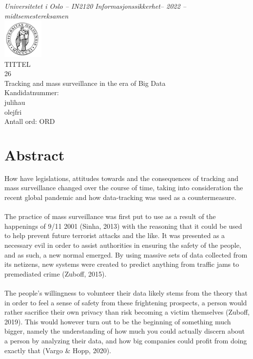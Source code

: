 \documentclass[11pt]{article}
\newcommand{\tittel}{TITTEL} %
\newcommand{\temanr}{26} %
\newcommand{\tematittel}{Tracking and mass surveillance in the era of Big Data} %
\newcommand{\kandidatnrforside}{julihau \\ olejfri}  %
\newcommand{\antallord}{ORD} %
\begin{document}
 \thispagestyle{empty}
\begin{center}
\normalsize{\textit{Universitetet i Oslo -- IN2120 Informasjonssikkerhet-- 2022 -- midtsemestereksamen}} \\
\vspace{1cm}
\includegraphics[width=0.15\textwidth]{uio_logo.png} \\
\vspace{1cm}
\huge{\tittel} \\
\Large{\temanr} \\
\Large{\tematittel} \\
\vspace{1cm}
\Large{Kandidatnummer:} \\
\large{\kandidatnrforside} \\
\vspace{1cm}
\Large{Antall ord: \antallord} \\
\end{center}
\tableofcontents
\newpage



\section{Abstract}
How have legislations, attitudes towards and the consequences of tracking and mass surveillance changed over the course of time, taking into consideration the recent global pandemic and how data-tracking was used as a countermeasure. \\ \\

The practice of mass surveillance was first put to use as a result of the happenings of 9/11 2001 (Sinha, 2013) with the reasoning that it could be used to help prevent future terrorist attacks and the like. It was presented as a necessary evil in order to assist authorities in ensuring the safety of the people, and as such, a new normal emerged. By using massive sets of data collected from its netizens, new systems were created to predict anything from traffic jams to premediated crime (Zuboff, 2015).  \\ \\

The people’s willingness to volunteer their data likely stems from the theory that in order to feel a sense of safety from these frightening prospects, a person would rather sacrifice their own privacy than risk becoming a victim themselves (Zuboff, 2019). This would however turn out to be the beginning of something much bigger, namely the understanding of how much you could actually discern about a person by analyzing their data, and how big companies could profit from doing exactly that (Vargo \& Hopp, 2020).  \\ \\
\end{document}
